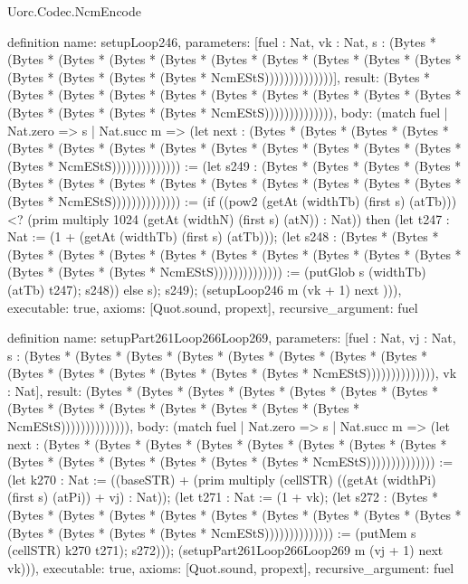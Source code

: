 \begin{lexlean}{Uorc.Codec.NcmEncode}
\begin{semanticmodule}
definition{
  name: setupLoop246,
  parameters: [fuel : Nat, vk : Nat, s : (Bytes * (Bytes * (Bytes * (Bytes * (Bytes * (Bytes * (Bytes * (Bytes * (Bytes * (Bytes * (Bytes * (Bytes * (Bytes * (Bytes * NcmEStS))))))))))))))],
  result: (Bytes * (Bytes * (Bytes * (Bytes * (Bytes * (Bytes * (Bytes * (Bytes * (Bytes * (Bytes * (Bytes * (Bytes * (Bytes * (Bytes * NcmEStS)))))))))))))),
  body: (match fuel
    | Nat.zero => s
    | Nat.succ m => (let next : (Bytes * (Bytes * (Bytes * (Bytes * (Bytes * (Bytes * (Bytes * (Bytes * (Bytes * (Bytes * (Bytes * (Bytes * (Bytes * (Bytes * NcmEStS)))))))))))))) := (let s249 : (Bytes * (Bytes * (Bytes * (Bytes * (Bytes * (Bytes * (Bytes * (Bytes * (Bytes * (Bytes * (Bytes * (Bytes * (Bytes * (Bytes * NcmEStS)))))))))))))) := (if ((pow2 (getAt (widthTb) (first s) (atTb))) <? (prim multiply 1024 (getAt (widthN) (first s) (atN)) : Nat)) then (let t247 : Nat := (1 + (getAt (widthTb) (first s) (atTb))); (let s248 : (Bytes * (Bytes * (Bytes * (Bytes * (Bytes * (Bytes * (Bytes * (Bytes * (Bytes * (Bytes * (Bytes * (Bytes * (Bytes * (Bytes * NcmEStS)))))))))))))) := (putGlob s (widthTb) (atTb) t247); s248)) else s); s249); (setupLoop246 m (vk + 1) next ))),
  executable: true,
  axioms: [Quot.sound, propext],
  recursive_argument: fuel
}

definition{
  name: setupPart261Loop266Loop269,
  parameters: [fuel : Nat, vj : Nat, s : (Bytes * (Bytes * (Bytes * (Bytes * (Bytes * (Bytes * (Bytes * (Bytes * (Bytes * (Bytes * (Bytes * (Bytes * (Bytes * (Bytes * NcmEStS)))))))))))))), vk : Nat],
  result: (Bytes * (Bytes * (Bytes * (Bytes * (Bytes * (Bytes * (Bytes * (Bytes * (Bytes * (Bytes * (Bytes * (Bytes * (Bytes * (Bytes * NcmEStS)))))))))))))),
  body: (match fuel
    | Nat.zero => s
    | Nat.succ m => (let next : (Bytes * (Bytes * (Bytes * (Bytes * (Bytes * (Bytes * (Bytes * (Bytes * (Bytes * (Bytes * (Bytes * (Bytes * (Bytes * (Bytes * NcmEStS)))))))))))))) := (let k270 : Nat := ((baseSTR) + (prim multiply (cellSTR) ((getAt (widthPi) (first s) (atPi)) + vj) : Nat)); (let t271 : Nat := (1 + vk); (let s272 : (Bytes * (Bytes * (Bytes * (Bytes * (Bytes * (Bytes * (Bytes * (Bytes * (Bytes * (Bytes * (Bytes * (Bytes * (Bytes * (Bytes * NcmEStS)))))))))))))) := (putMem s (cellSTR) k270 t271); s272))); (setupPart261Loop266Loop269 m (vj + 1) next vk))),
  executable: true,
  axioms: [Quot.sound, propext],
  recursive_argument: fuel
}


\end{semanticmodule}
\end{lexlean}
